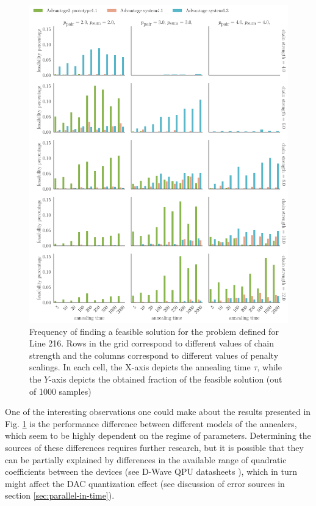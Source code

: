 \begin{figure}
  \includegraphics[width=\textwidth]{figures/dwave_line_216_result.pdf}
  \caption{
    Frequency of finding a feasible solution for the problem defined for Line 216.
    Rows in the grid correspond to different values of chain strength and the
    columns correspond to different values of penalty scalings. In each cell, the
    X-axis depicts the annealing time $\tau$, while the $Y$-axis depicts the
    obtained fraction of the feasible solution (out of 1000 samples) }
  \label{fig:dwline216freq}
\end{figure}

One of the interesting observations one could make about the results presented
in Fig. \ref{fig:dwline216freq} is the performance difference between different
models of the annealers, which seem to be highly dependent on the regime of
parameters. Determining the sources of these differences requires further
research, but it is possible that they can be partially explained by
differences in the available range of quadratic coefficients between the
devices (see D-Wave QPU datasheets \cite{dwavedocs}), which in turn might
affect the DAC quantization effect (see discussion of error sources in section
\ref{sec:parallel-in-time}).


